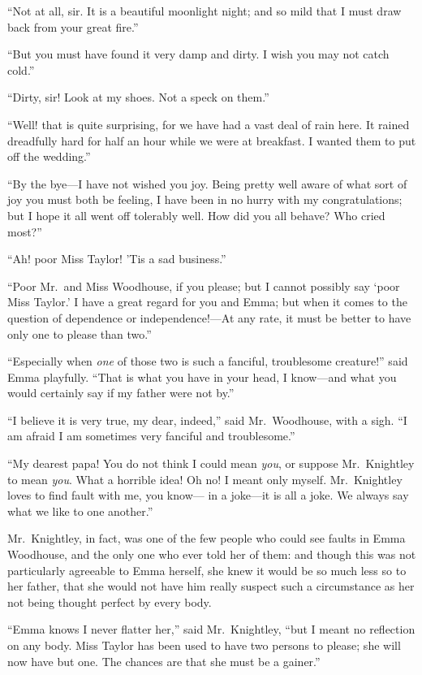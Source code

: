 ``Not at all, sir.  It is a beautiful moonlight night; and so mild
that I must draw back from your great fire.''

``But you must have found it very damp and dirty.  I wish you may
not catch cold.''

``Dirty, sir! Look at my shoes.  Not a speck on them.''

``Well! that is quite surprising, for we have had a vast deal
of rain here.  It rained dreadfully hard for half an hour
while we were at breakfast.  I wanted them to put off the wedding.''

``By the bye---I have not wished you joy.  Being pretty well aware
of what sort of joy you must both be feeling, I have been in no hurry
with my congratulations; but I hope it all went off tolerably well.
How did you all behave? Who cried most?''

``Ah! poor Miss Taylor! 'Tis a sad business.''

``Poor Mr.\ and Miss Woodhouse, if you please; but I cannot possibly
say `poor Miss Taylor.' I have a great regard for you and Emma;
but when it comes to the question of dependence or independence!---At
any rate, it must be better to have only one to please than two.''

``Especially when \emph{one} of those two is such a fanciful, troublesome creature!''
said Emma playfully.  ``That is what you have in your head,
I know---and what you would certainly say if my father were not by.''

``I believe it is very true, my dear, indeed,'' said Mr.\ Woodhouse,
with a sigh.  ``I am afraid I am sometimes very fanciful and troublesome.''

``My dearest papa! You do not think I could mean \emph{you}, or suppose
Mr.\ Knightley to mean \emph{you}.  What a horrible idea! Oh no! I meant
only myself.  Mr.\ Knightley loves to find fault with me, you know---%
in a joke---it is all a joke.  We always say what we like to one another.''

Mr.\ Knightley, in fact, was one of the few people who could see
faults in Emma Woodhouse, and the only one who ever told her of them:
and though this was not particularly agreeable to Emma herself,
she knew it would be so much less so to her father, that she would
not have him really suspect such a circumstance as her not being
thought perfect by every body.

``Emma knows I never flatter her,'' said Mr.\ Knightley, ``but I
meant no reflection on any body.  Miss Taylor has been used
to have two persons to please; she will now have but one.
The chances are that she must be a gainer.''


